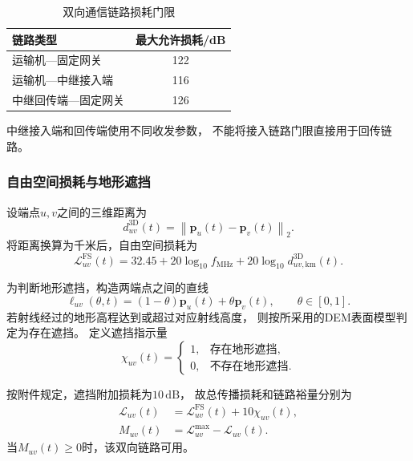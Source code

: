 \documentclass[bwprint]{gmcmthesis}
\begin{document}
\begin{table}[htbp]
    \centering
    \caption{双向通信链路损耗门限}
    \label{tab:q3_link_budget}
    \begin{tabular}{lc}
        \toprule
        链路类型 & 最大允许损耗/dB \\
        \midrule
        运输机—固定网关 & 122 \\
        运输机—中继接入端 & 116 \\
        中继回传端—固定网关 & 126 \\
        \bottomrule
    \end{tabular}
\end{table}

中继接入端和回传端使用不同收发参数，
不能将接入链路门限直接用于回传链路。

\subsubsection{自由空间损耗与地形遮挡}

设端点$u,v$之间的三维距离为
\begin{equation}
    d_{uv}^{\mathrm{3D}}(t)
    =
    \left\|
    \boldsymbol{p}_u(t)-\boldsymbol{p}_v(t)
    \right\|_2.
\end{equation}
将距离换算为千米后，自由空间损耗为
\begin{equation}
    \mathcal{L}_{uv}^{\mathrm{FS}}(t)
    =
    32.45
    +20\log_{10}f_{\mathrm{MHz}}
    +20\log_{10}d_{uv,\mathrm{km}}^{\mathrm{3D}}(t).
    \label{eq:q3_fspl}
\end{equation}

为判断地形遮挡，构造两端点之间的直线
\begin{equation}
    \boldsymbol{\ell}_{uv}(\theta,t)
    =
    (1-\theta)\boldsymbol{p}_u(t)
    +\theta\boldsymbol{p}_v(t),
    \qquad \theta\in[0,1].
\end{equation}
若射线经过的地形高程达到或超过对应射线高度，
则按所采用的DEM表面模型判定为存在遮挡。
定义遮挡指示量
\begin{equation}
    \chi_{uv}(t)
    =
    \begin{cases}
        1,&\text{存在地形遮挡},\\
        0,&\text{不存在地形遮挡}.
    \end{cases}
\end{equation}

按附件规定，遮挡附加损耗为$10\,\mathrm{dB}$，
故总传播损耗和链路裕量分别为
\begin{align}
    \mathcal{L}_{uv}(t)
    &=
    \mathcal{L}_{uv}^{\mathrm{FS}}(t)
    +10\chi_{uv}(t),\\
    M_{uv}(t)
    &=
    \mathcal{L}_{uv}^{\max}
    -\mathcal{L}_{uv}(t).
\end{align}
当$M_{uv}(t)\geq0$时，该双向链路可用。
\end{document}
